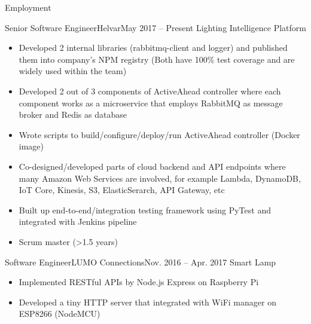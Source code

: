 \documentclass[print]{mcdowellcv}
\begin{document}
	\makeheader
	
	\begin{cvsection}{Employment}
		\begin{cvsubsection}{Senior Software Engineer}{Helvar}{May 2017 -- Present}
			Lighting Intelligence Platform
			\begin{itemize}
				\item Developed 2 internal libraries (rabbitmq-client and logger) and published them into company's NPM registry (Both have 100\% test coverage and are widely used within the team)
				\item Developed 2 out of 3 components of ActiveAhead controller where each component works as a microservice that employs RabbitMQ as message broker and Redis as database
				\item Wrote scripts to build/configure/deploy/run ActiveAhead controller (Docker image)
				\item Co-designed/developed parts of cloud backend and API endpoints where many Amazon Web Services are involved, for example Lambda, DynamoDB, IoT Core, Kinesis, S3, ElasticSerarch, API Gateway, etc
				\item Built up end-to-end/integration testing framework using PyTest and integrated with Jenkins pipeline
				\item Scrum master (>1.5 years)
			\end{itemize}
		\end{cvsubsection}
		
		\begin{cvsubsection}{Software Engineer}{LUMO Connections}{Nov. 2016 -- Apr. 2017}
			Smart Lamp
			\begin{itemize}
				\item Implemented RESTful APIs by Node.js Express on Raspberry Pi
				\item Developed a tiny HTTP server that integrated with WiFi manager on ESP8266 (NodeMCU)
			\end{itemize}
		\end{cvsubsection}
			

\end{cvsection}
\end{document}
